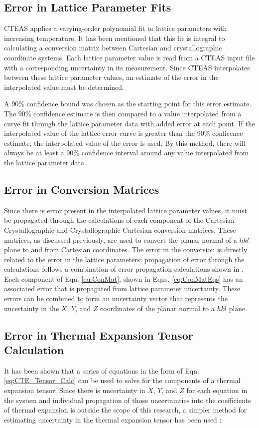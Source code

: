 \subsection{Error in Lattice Parameter Fits}
CTEAS applies a varying-order polynomial fit to lattice parameters with increasing temperature.  It has been mentioned that this fit is integral to calculating a conversion matrix between Cartesian and crystallographic coordinate systems.  Each lattice parameter value is read from a CTEAS input file with a corresponding uncertainty in its measurement.  Since CTEAS interpolates between these lattice parameter values, an estimate of the error in the interpolated value must be determined.  

A 90\% confidence bound was chosen as the starting point for this error estimate.  The 90\% confidence estimate is then compared to a value interpolated from a curve fit through the lattice parameter data with added error at each point.  If the interpolated value of the lattice-error curve is greater than the 90\% conficence estimate, the interpolated value of the error is used.  By this method, there will always be at least a 90\% confidence interval around any value interpolated from the lattice parameter data.

\subsection{Error in Conversion Matrices}
Since there is error present in the interpolated lattice parameter values, it must be propagated through the calculations of each component of the Cartesian-Crystallographic and Crystallographic-Cartesian conversion matrices.  These matrices, as discussed previously, are used to convert the planar normal of a $hkl$ plane to and from Cartesian coordinates.  The error in the conversion is directly related to the error in the lattice parameters; propagation of error through the calculations follows a combination of error propagation calculations shown in \cite{Taylor-1997}.  Each component of Eqn. \ref{eq:ConMat}, shown in Eqns. \ref{eq:ConMatEqs} has an associated error that is propagated from lattice parameter uncertainty.  These errors can be combined to form an uncertainty vector that represents the uncertainty in the $X$, $Y$, and $Z$ coordinates  of the planar normal to a $hkl$ plane.  

\subsection{Error in Thermal Expansion Tensor Calculation}
It has been shown that a series of equations in the form of Eqn. \ref{eq:CTE_Tensor_Calc} can be used to solve for the components of a thermal expansion tensor.  Since there is uncertainty in $X$, $Y$, and $Z$ for each equation in the system and individual propagation of those uncertainties into the coefficients of thermal expansion is outside the scope of this research, a simpler method for estimating uncertainty in the thermal expansion tensor has been used \cite{Kaw-2011}:

